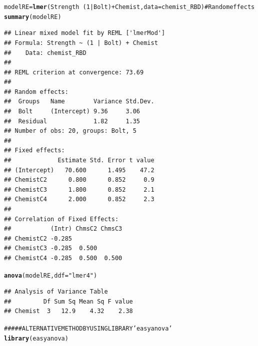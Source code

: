 \documentclass[a4paper]{article}\usepackage{graphicx, color}
\makeatletter
\newcommand{\hlfunctioncall}[1]{\textcolor[rgb]{0.501960784313725,0,0.329411764705882}{\textbf{#1}}}%
\newcommand{\hlstring}[1]{\textcolor[rgb]{0.6,0.6,1}{#1}}%
\newcommand{\hlcomment}[1]{\textcolor[rgb]{0.180392156862745,0.6,0.341176470588235}{#1}}%
\newenvironment{kframe}{%
 \def\at@end@of@kframe{}%
 \ifinner\ifhmode%
  \def\at@end@of@kframe{\end{minipage}}%
  \begin{minipage}{\columnwidth}%
 \fi\fi%
 \def\FrameCommand##1{\hskip\@totalleftmargin \hskip-\fboxsep
 \colorbox{shadecolor}{##1}\hskip-\fboxsep
     \hskip-\linewidth \hskip-\@totalleftmargin \hskip\columnwidth}%
 \MakeFramed {\advance\hsize-\width
   \@totalleftmargin\z@ \linewidth\hsize
   \@setminipage}}%
 {\par\unskip\endMakeFramed%
 \at@end@of@kframe}
\newenvironment{knitrout}{}{} %
\makeatother
\begin{document}
\begin{knitrout}
\begin{kframe}
{\ttfamily\noindent\itshape\color{messagecolor}{\#\# Loading required package: Matrix}}\begin{alltt}
modelRE = \hlfunctioncall{lmer}(Strength ~ (1 | Bolt) + Chemist, data = chemist_RBD)  \hlcomment{#Random effects}
\hlfunctioncall{summary}(modelRE)
\end{alltt}
\begin{verbatim}
## Linear mixed model fit by REML ['lmerMod']
## Formula: Strength ~ (1 | Bolt) + Chemist 
##    Data: chemist_RBD 
## 
## REML criterion at convergence: 73.69 
## 
## Random effects:
##  Groups   Name        Variance Std.Dev.
##  Bolt     (Intercept) 9.36     3.06    
##  Residual             1.82     1.35    
## Number of obs: 20, groups: Bolt, 5
## 
## Fixed effects:
##             Estimate Std. Error t value
## (Intercept)   70.600      1.495    47.2
## ChemistC2      0.800      0.852     0.9
## ChemistC3      1.800      0.852     2.1
## ChemistC4      2.000      0.852     2.3
## 
## Correlation of Fixed Effects:
##           (Intr) ChmsC2 ChmsC3
## ChemistC2 -0.285              
## ChemistC3 -0.285  0.500       
## ChemistC4 -0.285  0.500  0.500
\end{verbatim}
\begin{alltt}
\hlfunctioncall{anova}(modelRE, ddf = \hlstring{"lmer4"})
\end{alltt}
\begin{verbatim}
## Analysis of Variance Table
##         Df Sum Sq Mean Sq F value
## Chemist  3   12.9    4.32    2.38
\end{verbatim}
\begin{alltt}


\hlcomment{##### ALTERNATIVE METHOD BY USING LIBRARY 'easyanova'}
\hlfunctioncall{library}(easyanova)
\end{alltt}


{\ttfamily\noindent\itshape\color{messagecolor}{\#\# Loading required package: car}}

{\ttfamily\noindent\itshape\color{messagecolor}{\#\# Loading required package: MASS}}

{\ttfamily\noindent\itshape\color{messagecolor}{\#\# Loading required package: nnet}}

{\ttfamily\noindent\itshape\color{messagecolor}{\#\# Loading required package: nlme}}

{\ttfamily\noindent\itshape\color{messagecolor}{\#\# \\\#\# Attaching package: 'nlme'}}


\end{kframe}
\end{knitrout}
\end{document}
